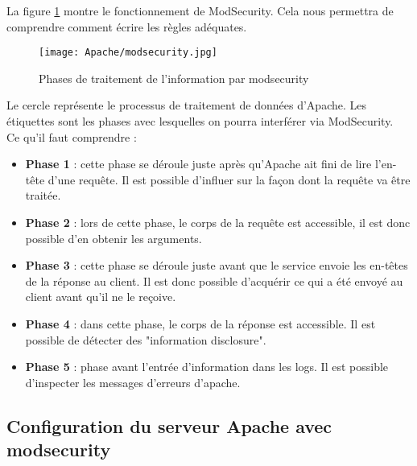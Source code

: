 La figure \ref{Apache/modsecurity} montre le fonctionnement de ModSecurity. Cela nous permettra de comprendre comment écrire les règles adéquates.
\begin{figure}[h!]
	\begin{center}
		\texttt{[image: Apache/modsecurity.jpg]}
		\caption{Phases de traitement de l'information par modsecurity \cite{modsecurity-phases}}
		\label{Apache/modsecurity}
	\end{center}
\end{figure}
\FloatBarrier 
Le cercle représente le processus de traitement de données d'Apache. Les étiquettes sont les phases avec lesquelles on pourra interférer via ModSecurity. \\
Ce qu'il faut comprendre :
\begin{itemize}
    \item \textbf{Phase 1} : cette phase se déroule juste après qu'Apache ait fini de lire l'en-tête d'une requête. Il est possible d'influer sur la façon dont la requête va être traitée.
    \item \textbf{Phase 2} : lors de cette phase, le corps de la requête est accessible, il est donc possible d'en obtenir les arguments.
    \item \textbf{Phase 3} : cette phase se déroule juste avant que le service envoie les en-têtes de la réponse au client. Il est donc possible d'acquérir ce qui a été envoyé au client avant qu'il ne le reçoive.
    \item \textbf{Phase 4} : dans cette phase, le corps de la réponse est accessible. Il est possible de détecter des "information disclosure".
    \item \textbf{Phase 5} : phase avant l'entrée d'information dans les logs. Il est possible d'inspecter les messages d'erreurs d'apache.
\end{itemize}

\subsection{Configuration du serveur Apache avec modsecurity}
